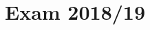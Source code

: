 \setcounter{section}{18}
\section{Exam 2018/19}
{
\renewcommand{\thesubsubsection}{\thesubsection\alph{subsubsection}}

}